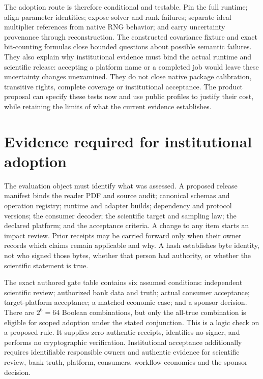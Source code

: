 The adoption route is therefore conditional and testable. Pin the full runtime; align parameter identities; expose solver and rank failures; separate ideal multiplier references from native RNG behavior; and carry uncertainty provenance through reconstruction. The constructed covariance fixture and exact bit-counting formulas close bounded questions about possible semantic failures. They also explain why institutional evidence must bind the actual runtime and scientific release: accepting a platform name or a completed job would leave these uncertainty changes unexamined. They do not close native package calibration, transitive rights, complete coverage or institutional acceptance. The product proposal can specify these tests now and use public profiles to justify their cost, while retaining the limits of what the current evidence establishes.~\citep{exec29_panel_runtime_sources,exec29_panel_runtime_reference}


\section{Evidence required for institutional adoption}
\label{exec17:signed-adoption}

The evaluation object must identify what was assessed. A proposed release
manifest binds the reader PDF and source audit; canonical schemas and operation
registry; runtime and adapter builds; dependency and protocol versions; the
consumer decoder; the scientific target and sampling law; the declared
platform; and the acceptance criteria. A change to any item starts an impact
review. Prior receipts may be carried forward only when their owner records
which claims remain applicable and why. A hash establishes byte identity, not
who signed those bytes, whether that person had authority, or whether the
scientific statement is true.

The exact authored gate table contains six assumed conditions: independent
scientific review; authorized bank data and truth; actual consumer acceptance;
target-platform acceptance; a matched economic case; and a sponsor decision.
There are $2^6=64$ Boolean combinations, but only the all-true combination is
eligible for scoped adoption under the stated conjunction. This is a logic
check on a proposed rule. It supplies zero authentic receipts, identifies no
signer, and performs no cryptographic verification. Institutional acceptance additionally requires identifiable responsible
owners and authentic evidence for scientific review, bank truth, platform,
consumers, workflow economics and the sponsor decision.~\citep{exec17_continuity_reference,exec17_continuity_contract}

